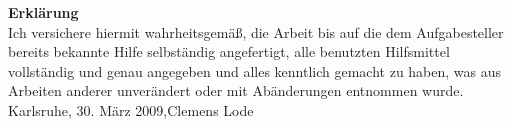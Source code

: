 \thispagestyle{empty}
\topmargin 0.8cm
\vspace{3cm}
{\large \textbf{Erkl\"arung}}
\vspace{2cm}
\\
Ich versichere hiermit wahrheitsgem\"a\ss , die Arbeit bis auf die dem Aufgabesteller bereits bekannte Hilfe selbst\"andig angefertigt, alle benutzten Hilfsmittel vollst\"andig und genau angegeben und alles kenntlich gemacht zu haben, was aus Arbeiten anderer unver\"andert oder mit Ab\"anderungen entnommen wurde.
\vspace{4cm}
\\
Karlsruhe, 30. M\"arz 2009,\;\;\;Clemens Lode
